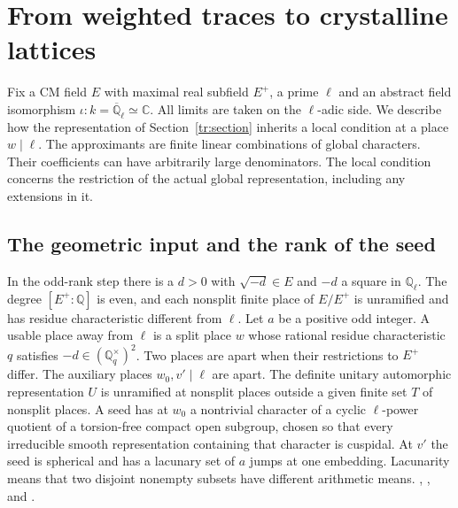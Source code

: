 \section{From weighted traces to crystalline lattices}\label{newgal:section}

Fix a CM field $E$ with maximal real subfield $E^+$, a prime $\ell$ and an
abstract field isomorphism $\iota:k=\overline{\mathbb Q}_\ell\simeq\mathbb C$.
All limits are taken on the $\ell$-adic side. We describe how the representation
of Section~\ref{tr:section} inherits a local condition at a place $w\mid\ell$.
The approximants are finite linear combinations of global characters. Their
coefficients can have arbitrarily large denominators. The local condition concerns
the restriction of the actual global representation, including any extensions in it.

\subsection{The geometric input and the rank of the seed}

In the odd-rank step there is a $d>0$ with $\sqrt{-d}\in E$ and $-d$ a square in
$\mathbb Q_\ell$. The degree $[E^+:\mathbb Q]$ is even, and each nonsplit finite
place of $E/E^+$ is unramified and has residue characteristic different from $\ell$.
Let $a$ be a positive odd integer. A usable place away from $\ell$ is a split
place $w$ whose rational residue characteristic $q$ satisfies
$-d\in(\mathbb Q_q^\times)^2$. Two places are apart when their restrictions
to $E^+$ differ. The auxiliary places $w_0,v'\mid\ell$ are apart. The definite
unitary automorphic representation $U$ is unramified at nonsplit places outside
a given finite set $T$ of nonsplit places. A seed has at $w_0$ a nontrivial
character of a cyclic $\ell$-power quotient of a torsion-free compact open
subgroup, chosen so that every irreducible smooth representation containing
that character is cuspidal. At $v'$ the seed is spherical and has a lacunary
set of $a$ jumps at one embedding. Lacunarity means that two disjoint nonempty
subsets have different arithmetic means.
,
, and
.

